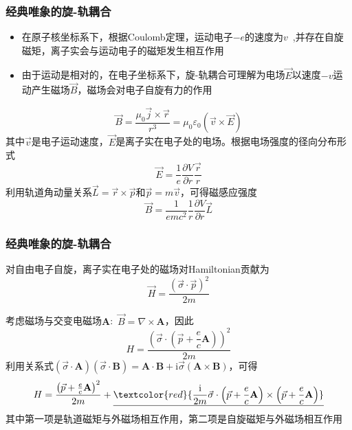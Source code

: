 \frame
{
	\frametitle{经典唯象的旋-轨耦合}
	\begin{itemize}
		\item 在原子核坐标系下，根据\textrm{Coulomb}定理，运动电子$-e$的速度为$v$~,并存在自旋磁矩，离子实会与运动电子的磁矩发生相互作用
		\item 由于运动是相对的，在电子坐标系下，旋-轨耦合可理解为电场$\vec E$以速度$-v$运动产生磁场$\vec B$，磁场会对电子自旋有力的作用
	\end{itemize}
	\begin{displaymath}
		\vec B=\frac{\mu_0\vec j\times\vec r}{r^3}=\mu_0\varepsilon_0(\vec v\times\vec E)
	\end{displaymath}
其中$\vec v$是电子运动速度，$\vec E$是离子实在电子处的电场。根据电场强度的径向分布形式
\begin{displaymath}
	\vec E=\frac1{e}\frac{\partial V}{\partial r}\frac{\vec r}r
\end{displaymath}
利用轨道角动量关系$\vec L=\vec r\times\vec p$和$\vec p=m\vec v$，可得磁感应强度
\begin{displaymath}
	\vec B=\frac1{emc^2}\frac1r\frac{\partial V}{\partial r}\vec L
\end{displaymath}
}

\frame
{
	\frametitle{经典唯象的旋-轨耦合}
对自由电子自旋，离子实在电子处的磁场对\textrm{Hamiltonian}贡献为
\begin{displaymath}
	\vec H=\frac{(\vec{\sigma}\cdot\vec p)^2}{2m}
\end{displaymath}

考虑磁场与交变电磁场$\mathbf{A}$:~$\vec B=\nabla\times\mathbf A$，因此
\begin{displaymath}
	H=\frac{\left( \vec{\sigma}\cdot\left( \vec p+\dfrac ec\mathbf A \right) \right)^2}{2m}
\end{displaymath}
利用关系式$(\vec{\sigma}\cdot\mathbf A)(\vec{\sigma}\cdot\mathbf B)=\mathbf{A}\cdot\mathbf{B}+\mathrm{i}\vec{\sigma}(\mathbf{A}\times\mathbf{B})$，可得
\begin{displaymath}
	H=\frac{\left( \vec p+\frac ec\mathbf{A} \right)^2}{2m}+\underline{\textcolor{red}{\frac{\mathrm i}{2m}\vec{\sigma}\cdot\left( \vec p+\frac ec\mathbf{A} \right)\times\left( \vec p+\frac ec\mathbf{A} \right)}}
\end{displaymath}
其中第一项是轨道磁矩与外磁场相互作用，第二项是自旋磁矩与外磁场相互作用
}

